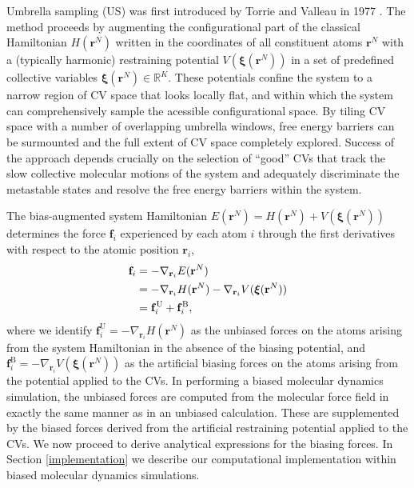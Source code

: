 \documentclass[12pt]{article}
\newcommand*{\blauw}[1]{#1}
\newcommand*{\groen}[1]{#1}
\begin{document}
Umbrella sampling (\groen{US}) was first introduced by Torrie and Valleau in 1977 \cite{torrie1977nonphysical}. The method proceeds by augmenting the configurational part of the classical Hamiltonian $H(\mathbf{r}^N)$ written in the coordinates of all constituent atoms $\mathbf{r}^N$ with a (typically harmonic) restraining potential $V(\boldsymbol\xi(\mathbf{r}^N))$ in a set of predefined collective variables $\boldsymbol\xi(\mathbf{r}^N) \in \mathbb{R}^K$. These potentials confine the system to a narrow region of CV space that looks locally flat, and within which the system can comprehensively sample the acessible configurational space\cite{roux1995calculation, chipot2007free}. By tiling CV space with a number of overlapping umbrella windows, free energy barriers can be surmounted and the full extent of CV space completely explored. Success of the approach depends crucially on the selection of ``good'' CVs that track the slow collective molecular motions of the system and adequately discriminate the metastable states and resolve the free energy barriers within the system.

The bias-augmented system Hamiltonian $E(\mathbf{r}^N) = H(\mathbf{r}^N) + V(\boldsymbol\xi(\mathbf{r}^N))$ determines the force $\mathbf{f}_i$ experienced by each atom $i$ through the first derivatives with respect to the atomic position $\mathbf{r}_i$,
\begin{align}
\mathbf{f}_i &= -\nabla_{\mathbf{r}_i} E(\mathbf{r}^N) \notag \\
&= -\nabla_{\mathbf{r}_i} H(\mathbf{r}^N) - \nabla_{\mathbf{r}_i} V(\boldsymbol\xi(\mathbf{r}^N)) \notag \\
&= \mathbf{f}_i^\mathrm{U} + \mathbf{f}_i^\mathrm{B},
\end{align}
where we identify $\mathbf{f}_i^\mathrm{U} = -\nabla_{\mathbf{r}_i} H(\mathbf{r}^N)$ as the unbiased forces on the atoms arising from the system Hamiltonian in the absence of the biasing potential, and $\mathbf{f}_i^\mathrm{B} = - \nabla_{\mathbf{r}_i} V(\boldsymbol\xi(\mathbf{r}^N))$ as the artificial biasing forces on the atoms arising from the potential applied to the CVs. In performing a biased molecular dynamics simulation, the unbiased forces are computed from the molecular force field in exactly the same manner as in an unbiased calculation. These are supplemented by the biased forces derived from the artificial restraining potential applied to the CVs. We now proceed to derive analytical expressions for the biasing forces. In \blauw{Section \ref{implementation}} we describe our computational implementation within biased molecular dynamics simulations.
\end{document}
